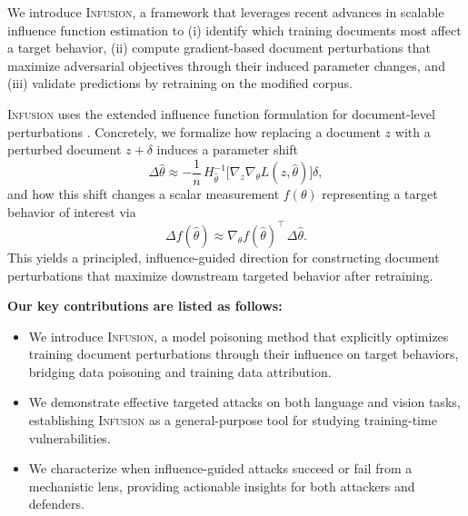 \documentclass{article}
\theoremstyle{plain}
\theoremstyle{definition}
\theoremstyle{remark}
\begin{document}


We introduce \textsc{Infusion}, a framework that leverages recent advances in scalable influence function estimation \citep{grosse2023studying} to (i) identify which training documents most affect a target behavior, (ii) compute gradient-based document perturbations that maximize adversarial objectives through their induced parameter changes, and (iii) validate predictions by retraining on the modified corpus.


\textsc{Infusion} uses the extended influence function formulation for document-level perturbations \citep{koh2017understanding}. Concretely, we formalize how replacing a document $z$ with a perturbed document $z+\delta$ induces a parameter shift
\begin{equation}
\Delta \hat{\theta}
\approx
-\frac{1}{n}\, H_{\hat{\theta}}^{-1}
\Big[\nabla_{z}\nabla_{\theta} L\!\left(z,\hat{\theta}\right)\Big]\delta,
\end{equation}
and how this shift changes a scalar measurement $f(\theta)$ representing a target behavior of interest via
\begin{equation}
\Delta f(\hat{\theta})
\approx
\nabla_{\theta} f(\hat{\theta})^{\top}\,\Delta \hat{\theta}.
\end{equation}
This yields a principled, influence-guided direction for constructing document perturbations that maximize downstream targeted behavior after retraining.


\textbf{Our key contributions are listed as follows:}
\begin{itemize}
    \item We introduce \textsc{Infusion}, a model poisoning method that explicitly optimizes training document perturbations through their influence on target behaviors, bridging data poisoning and training data attribution.
    \item We demonstrate effective targeted attacks on both language and vision tasks, establishing \textsc{Infusion} as a general-purpose tool for studying training-time vulnerabilities.
    \item We characterize when influence-guided attacks succeed or fail from a mechanistic lens, providing actionable insights for both attackers and defenders.
\end{itemize}
\end{document}
